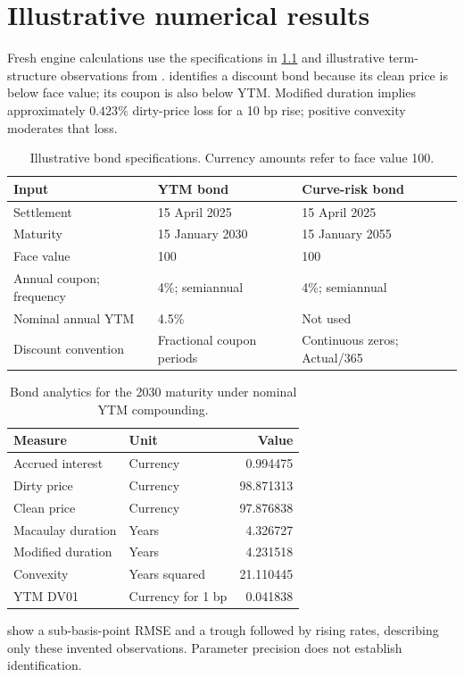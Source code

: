 \chapter{Illustrative numerical results}\label{ch:results}
Fresh engine calculations use the specifications in \cref{tab:bond-inputs} and illustrative term-structure observations from .  identifies a discount bond because its clean price is below face value; its coupon is also below YTM. Modified duration implies approximately \(0.423\%\) dirty-price loss for a 10 bp rise; positive convexity moderates that loss.

\begin{table}[htbp]
\centering\small
\caption{Illustrative bond specifications. Currency amounts refer to face value 100.}\label{tab:bond-inputs}
\begin{tabular}{@{}lll@{}}
\toprule Input & YTM bond & Curve-risk bond\\\midrule
Settlement & 15 April 2025 & 15 April 2025\\
Maturity & 15 January 2030 & 15 January 2055\\
Face value & 100 & 100\\
Annual coupon; frequency & 4\%; semiannual & 4\%; semiannual\\
Nominal annual YTM & 4.5\% & Not used\\
Discount convention & Fractional coupon periods & Continuous zeros; Actual/365\\
\bottomrule
\end{tabular}\resultsource
\end{table}
\begin{table}[htbp]
\centering\small
\caption{Bond analytics for the 2030 maturity under nominal YTM compounding.}\label{tab:bond-results}
\begin{tabular}{@{}llr@{}}
\toprule Measure & Unit & Value\\\midrule
Accrued interest & Currency & 0.994475\\
Dirty price & Currency & 98.871313\\
Clean price & Currency & 97.876838\\
Macaulay duration & Years & 4.326727\\
Modified duration & Years & 4.231518\\
Convexity & Years squared & 21.110445\\
YTM DV01 & Currency for 1 bp & 0.041838\\
\bottomrule
\end{tabular}\resultsource
\end{table}
\clearpage
{} show a sub-basis-point RMSE and a trough followed by rising rates, describing only these invented observations. Parameter precision does not establish identification.

